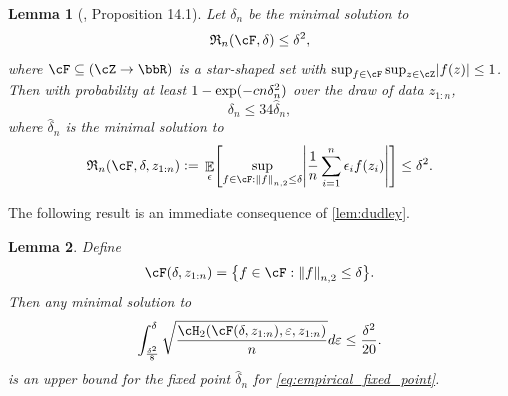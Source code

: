 \documentclass[11pt]{article} %
\newcommand{\pref}[1]{\cref{#1}}
\theoremstyle{theorem}  %
\newtheorem{lemma}{Lemma}
\theoremstyle{plain}
\DeclarePairedDelimiter{\abs}{\lvert}{\rvert} %
\DeclarePairedDelimiter{\brk}{[}{]}
\DeclarePairedDelimiter{\crl}{\{}{\}}
\DeclarePairedDelimiter{\prn}{(}{)}
\DeclarePairedDelimiter{\nrm}{\|}{\|}
\DeclareMathOperator{\En}{\mathbb{E}}
\newcommand{\eps}{\epsilon}
\newcommand{\veps}{\varepsilon}
\newcommand{\ldef}{\vcentcolon=}
\newcommand{\wh}[1]{\widehat{#1}}
\newcommand{\zr}[1][n]{z_{1:#1}}
\newcommand{\Rad}{\mathfrak{R}_{n}}
\begin{document}
\begin{lemma}[\cite{wainwright2019}, Proposition 14.1]
\label{lem:fixed_point_empirical}
Let $\delta_{n}$ be the minimal solution to
\[
\Rad(\cF,\delta)\leq{} \delta^{2},
\]
where $\cF\subseteq{}(\cZ\to\bbR)$ is a star-shaped set with $\sup_{f\in\cF}\sup_{z\in\cZ}\abs*{f(z)}\leq{}1$. Then with probability at least $1-\exp\prn{-cn\delta^{2}_n}$ over the draw of data $\zr[n]$, %
\[
\delta_{n}\leq{}34\wh{\delta}_{n},
\]
where $\wh{\delta}_{n}$ is the minimal solution to
\begin{equation}
\label{eq:empirical_fixed_point}
\Rad(\cF,\delta,\zr[n])\ldef{}\En_{\eps}\brk*{\sup_{f\in\cF:\nrm*{f}_{n,2}\leq{}\delta}\abs*{\frac{1}{n}\sum_{i=1}^{n}\eps_if(z_i)}} \leq{} \delta^{2}.
\end{equation}

\end{lemma}
The following result is an immediate consequence of \pref{lem:dudley}.
\begin{lemma}
\label{prop:dudley_fixed_point}
Define
\begin{equation}
\cF(\delta,\zr[n]) = \crl[\big]{f\in\cF: \nrm*{f}_{n,2}\leq{}\delta}.
\end{equation}
Then any minimal solution to
\begin{equation}
\label{eq:dudley_fixed_point}
\int_{\frac{\delta^{2}}{8}}^{\delta} \sqrt{\frac{\cH_2(\cF(\delta,\zr[n]),\veps,\zr[n])}{n}} d\veps \leq{} \frac{\delta^{2}}{20}.
\end{equation}
is an upper bound for the fixed point $\wh{\delta}_{n}$ for \pref{eq:empirical_fixed_point}.
\end{lemma}
%
%
%
\end{document}
